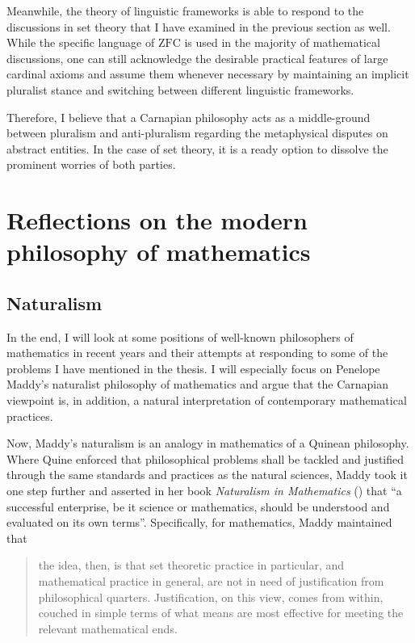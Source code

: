 \documentclass[12pt]{article}
\theoremstyle{plain}
\theoremstyle{definition}
\newcommand{\ZFC}{\mathrm{ZFC}}
\begin{document}
Meanwhile, the theory of linguistic frameworks is able to respond to the discussions in set theory that I have examined in the previous section as well. While the specific language of $\ZFC$ is used in the majority of mathematical discussions, one can still acknowledge the desirable practical features of large cardinal axioms and assume them whenever necessary by maintaining an implicit pluralist stance and switching between different linguistic frameworks.

Therefore, I believe that a Carnapian philosophy acts as a middle-ground between pluralism and anti-pluralism regarding the metaphysical disputes on abstract entities. In the case of set theory, it is a ready option to dissolve the prominent worries of both parties.

\section{Reflections on the modern philosophy of mathematics}

\subsection{Naturalism}

In the end, I will look at some positions of well-known philosophers of mathematics in recent years and their attempts at responding to some of the problems I have mentioned in the thesis. I will especially focus on Penelope Maddy's naturalist philosophy of mathematics and argue that the Carnapian viewpoint is, in addition, a natural interpretation of contemporary mathematical practices.

Now, Maddy's naturalism is an analogy in mathematics of a Quinean philosophy. Where Quine enforced that philosophical problems shall be tackled and justified through the same standards and practices as the natural sciences, Maddy took it one step further and asserted in her book \emph{Naturalism in Mathematics} (\cite{maddy-naturalism}) that ``a successful enterprise, be it science or mathematics, should be understood and evaluated on its own terms''. Specifically, for mathematics, Maddy maintained that

\begin{quote}
	the idea, then, is that set theoretic practice in particular, and mathematical practice in general, are not in need of justification from philosophical quarters. Justification, on this view, comes from within, couched in simple terms of what means are most effective for meeting the relevant mathematical ends.
\end{quote}
\end{document}
